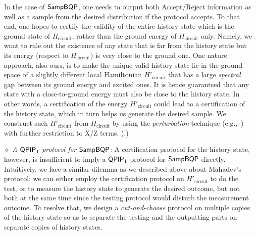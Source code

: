 In the case of $\operatorname{\mathsf{SampBQP}}$, one needs to output both Accept/Reject information as well as a sample from the desired distribution if the protocol accepts. 
To that end, one hopes to certify the validity of the entire history state which is the ground state of $H_{\mathrm{circuit}}$, rather than the ground energy of $H_{\mathrm{circuit}}$ only. 
Namely, we want to rule out the existence of any state that is far from the history state but its energy (respect to $H_{\mathrm{circuit}}$) is very close to the ground one. 
One nature approach, also ours, is to make the unique valid history state lie in the ground space of a slightly different local Hamiltonian $H'_{\mathrm{circuit}}$ that has a large \emph{spectral} gap between its ground energy and excited ones.
It is hence guaranteed that any state with a close-to-ground energy must also be close to the history state.
In other words, a certification of the energy $H'_{\mathrm{circuit}}$ could lead to a certification of the history state, which in turn helps us generate the desired sample. 
We construct such $H'_{\mathrm{circuit}}$ from $H_{\mathrm{circuit}}$ by using the \emph{perturbation} technique (e.g.,~\cite{kempe_kitaev_regev_2006}) with further restriction to X/Z terms. (.)



\vspace{2mm} \noindent \emph{$\diamond$ A $\operatorname{\mathsf{QPIP}}_1$ protocol for $\operatorname{\mathsf{SampBQP}}$:} A certification protocol for the history state, however, is insufficient to imply a $\operatorname{\mathsf{QPIP}}_1$ protocol for $\operatorname{\mathsf{SampBQP}}$ directly. 
Intuitively, we face a similar dilemma as we described above about Mahadev's protocol: we can either employ the certification protocol on $H'_{\mathrm{circuit}}$ to do the test, or to measure the history state to generate the desired outcome, but not both at the same time since the testing protocol would disturb the measurement outcome.
To resolve that, we design a \emph{cut-and-choose} protocol on multiple copies of the history state so as to separate the testing and the outputting parts on separate copies of history states. 

